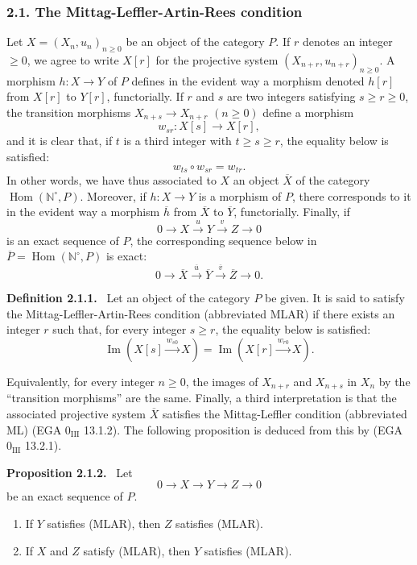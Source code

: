 \documentclass[11pt]{article}
\providecommand{\NN}{\mathbb{N}}
\newenvironment{statement}[1]{\par\medskip\noindent\textbf{#1.}\ }{\par\medskip}
\DeclareMathOperator{\Hom}{Hom}
\providecommand{\Hom}{\operatorname{Hom}}
\providecommand{\NN}{\mathbb N}
\providecommand{\Im}{\operatorname{Im}}
\renewcommand{\Im}{\operatorname{Im}}
\providecommand{\Im}{\operatorname{Im}}
\providecommand{\Hom}{\operatorname{Hom}}
\begin{document}
\subsubsection*{2.1. The Mittag-Leffler-Artin-Rees condition}\label{sga5:V:subsubsection:2.1}
Let $X=(X_n,u_n)_{n\ge0}$ be an object of the category $P$. If $r$ denotes an integer $\ge0$, we agree to write $X[r]$ for the projective system $(X_{n+r},u_{n+r})_{n\ge0}$. A morphism $h:X\to Y$ of $P$ defines in the evident way a morphism denoted $h[r]$ from $X[r]$ to $Y[r]$, functorially. If $r$ and $s$ are two integers satisfying $s\ge r\ge0$, the transition morphisms $X_{n+s}\to X_{n+r}$ $(n\ge0)$ define a morphism
\[
w_{sr}:X[s]\longrightarrow X[r],
\]
and it is clear that, if $t$ is a third integer with $t\ge s\ge r$, the equality below is satisfied:
\[
w_{ts}\circ w_{sr}=w_{tr}.
\]
In other words, we have thus associated to $X$ an object $\overline X$ of the category $\Hom(\NN^\circ,P)$. Moreover, if $h:X\to Y$ is a morphism of $P$, there corresponds to it in the evident way a morphism $\overline h$ from $\overline X$ to $\overline Y$, functorially. Finally, if
\[
0\longrightarrow X\stackrel{u}{\longrightarrow}Y\stackrel{v}{\longrightarrow}Z\longrightarrow0
\]
is an exact sequence of $P$, the corresponding sequence below in $\overline P=\Hom(\NN^\circ,P)$ is exact:
\[
0\longrightarrow\overline X\stackrel{\overline u}{\longrightarrow}\overline Y\stackrel{\overline v}{\longrightarrow}\overline Z\longrightarrow0.
\]

\label{sga5:V:definition:2.1.1}\begin{statement}{Definition 2.1.1}
Let an object of the category $P$ be given. It is said to satisfy the Mittag-Leffler-Artin-Rees condition (abbreviated MLAR) if there exists an integer $r$ such that, for every integer $s\ge r$, the equality below is satisfied:
\[
\Im(X[s]\xrightarrow{w_{s0}}X)=\Im(X[r]\xrightarrow{w_{r0}}X).
\]
\end{statement}
Equivalently, for every integer $n\ge0$, the images of $X_{n+r}$ and $X_{n+s}$ in $X_n$ by the ``transition morphisms'' are the same. Finally, a third interpretation is that the associated projective system $\overline X$ satisfies the Mittag-Leffler condition (abbreviated ML) (EGA $0_{\mathrm{III}}$ 13.1.2). The following proposition is deduced from this by (EGA $0_{\mathrm{III}}$ 13.2.1).

\label{sga5:V:proposition:2.1.2}\begin{statement}{Proposition 2.1.2}
Let
\[
0\longrightarrow X\longrightarrow Y\longrightarrow Z\longrightarrow0
\]
be an exact sequence of $P$.
\begin{enumerate}[label=(\roman*)]
\item If $Y$ satisfies (MLAR), then $Z$ satisfies (MLAR).
\item If $X$ and $Z$ satisfy (MLAR), then $Y$ satisfies (MLAR).
\end{enumerate}
\end{statement}
\end{document}
